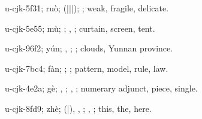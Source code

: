 \begin{multicols}{2}
{\cjkgGlue{}u-cjk-5f31; ruò; \cjkgGlue{}\cjkgGlue{}(\cjkgGlue{}|\cjkgGlue{}|\cjkgGlue{}|\cjkgGlue{}); \cjkgGlue{}; weak, fragile, delicate.

\cjkgGlue{}u-cjk-5e55; mù; \cjkgGlue{}; \cjkgGlue{}, \cjkgGlue{}; curtain, screen, tent.

\cjkgGlue{}u-cjk-96f2; yún; \cjkgGlue{}, \cjkgGlue{}; \cjkgGlue{}; clouds, Yunnan province.

\cjkgGlue{}u-cjk-7bc4; fàn; \cjkgGlue{}; \cjkgGlue{}; pattern, model, rule, law.

\cjkgGlue{}u-cjk-4e2a; gè; \cjkgGlue{}, \cjkgGlue{}; \cjkgGlue{}, \cjkgGlue{}; numerary adjunct, piece, single.

\cjkgGlue{}u-cjk-8fd9; zhè; \cjkgGlue{}\cjkgGlue{}(\cjkgGlue{}|\cjkgGlue{}), \cjkgGlue{}\cjkgGlue{}\cjkgGlue{}, \cjkgGlue{}; \cjkgGlue{}, \cjkgGlue{}; this, the, here.

}
\end{multicols}
